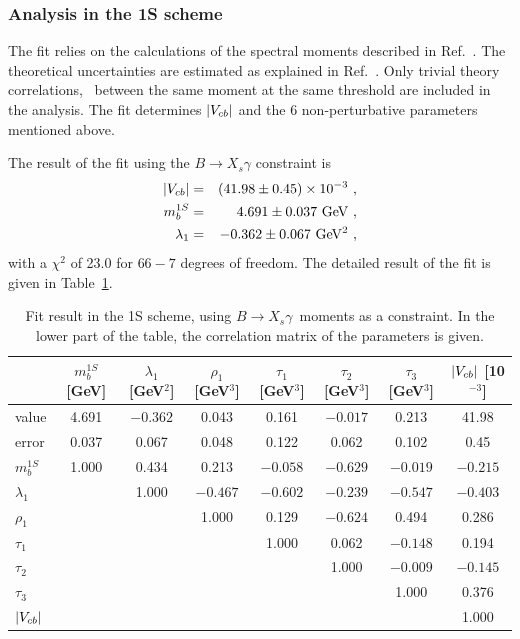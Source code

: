 \subsubsection{Analysis in the 1S scheme}
\label{globalfits1S}

The fit relies on the calculations of the spectral moments described in
Ref.~\cite{Bauer:2004ve}. The theoretical uncertainties are estimated
as explained in Ref.~\cite{Schwanda:2008kw}. Only trivial theory
correlations, \ie\ between the same moment at the same
threshold are included in the analysis. The fit determines $|V_{cb}|$ and
the 6 non-perturbative parameters mentioned above.

The result of the fit using the $B\to X_s\gamma$ constraint is
\begin{eqnarray}
  |V_{cb}| & = & (41.98\pm 0.45)\times 10^{-3}~, \\
  m_b^{1S} & = & 4.691\pm 0.037~{\rm GeV}~, \\
  \lambda_1 & = & -0.362\pm 0.067~{\rm GeV^2}~,
\end{eqnarray}
with a $\chi^2$ of 23.0 for $66-7$ degrees of freedom. The detailed
result of the fit is given in Table~\ref{tab:gf_res_xsgamma_1s}.
\begin{table}[!htb]
\caption{Fit result in the 1S scheme, using $B\to X_s\gamma$~moments
  as a constraint. In the lower part of the table, the correlation
  matrix of the parameters is given.} \label{tab:gf_res_xsgamma_1s}
\begin{center}
\begin{tabular}{|l|ccccccc|}
  \hline
  & $m_b^{1S}$ [GeV] & $\lambda_1$ [GeV$^2$] & $\rho_1$ [GeV$^3$] &
  $\tau_1$ [GeV$^3$] & $\tau_2$ [GeV$^3$] & $\tau_3$ [GeV$^3$] &
  $|V_{cb}|$ [10$^{-3}$]\\
  \hline \hline
  value & 4.691 & $-0.362$ & \phantom{$-$}0.043 &
  \phantom{$-$}0.161 & $-0.017$ & \phantom{$-$}0.213 &
  \phantom{$-$}41.98\\
  error & 0.037 & \phantom{$-$}0.067 & \phantom{$-$}0.048 &
  \phantom{$-$}0.122 & \phantom{$-$}0.062 & \phantom{$-$}0.102 &
  \phantom{$-$}0.45\\
  \hline
  $m_b^{1S}$ & 1.000 & \phantom{$-$}0.434 & \phantom{$-$}0.213 &
  $-0.058$ & $-0.629$ & $-0.019$ & $-0.215$\\
  $\lambda_1$ & & \phantom{$-$}1.000 & $-0.467$ & $-0.602$ & $-0.239$
  & $-0.547$ & $-0.403$\\
  $\rho_1$ & & & \phantom{$-$}1.000 & \phantom{$-$}0.129 & $-0.624$ &
  \phantom{$-$}0.494 & \phantom{$-$}0.286\\
  $\tau_1$ & & & & \phantom{$-$}1.000 & \phantom{$-$}0.062 & $-0.148$ &
  \phantom{$-$}0.194\\
  $\tau_2$ & & & & & \phantom{$-$}1.000 & $-0.009$ & $-0.145$\\
  $\tau_3$ & & & & & & \phantom{$-$}1.000 & \phantom{$-$}0.376\\
  $|V_{cb}|$ & & & & & & & \phantom{$-$}1.000\\
  \hline
\end{tabular}
\end{center}
\end{table}
